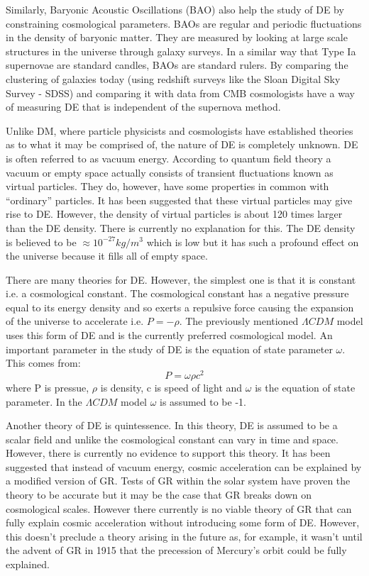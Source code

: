 \documentclass[a4paper,12pt]{article}
\begin{document}
Similarly, Baryonic Acoustic Oscillations (BAO) also
help the study of DE by constraining cosmological parameters. BAOs are regular and periodic fluctuations in the density of baryonic matter. They are measured by looking at large
scale structures in the universe through galaxy surveys. In a similar way that Type Ia supernovae
are standard candles, BAOs are standard rulers. By comparing the clustering of galaxies today (using redshift surveys like the Sloan Digital Sky Survey - SDSS) and comparing it with
data from CMB cosmologists have a way of measuring DE that is independent of the supernova method.

Unlike DM, where particle physicists and cosmologists have established theories as to what it may be comprised of, the nature of DE is completely unknown. DE is often referred to as
vacuum energy. According to quantum field theory a vacuum or empty space actually consists of transient fluctuations known as virtual particles. 
They do, however, have some properties in common with ``ordinary'' particles.
It has been suggested that these virtual particles may give
rise to DE. However, the density of virtual particles is about 120 times larger than the DE density. There is currently no explanation for this. The DE density is believed
to be $\approx10^{-27}kg/m^3$ which is low but it has such a profound effect on the universe because it fills all of empty space.

There are many theories for DE. However, the simplest one is that it is constant i.e. a cosmological constant. The cosmological constant has a negative pressure equal to
its energy density and so exerts a repulsive force causing the expansion of the universe to accelerate i.e. $P=-\rho$. The previously mentioned $\Lambda CDM$ model uses
this form of DE and is the currently preferred cosmological model. An important parameter in the study of DE is the equation of state parameter $\omega$. This comes from: 
\begin{equation}
P=\omega\rho c^2
\end{equation}
where P is pressue, $\rho$ is density, c is speed of light and $\omega$ is the equation of state parameter.
In the $\Lambda CDM$ model $\omega$ is assumed to be -1.

Another theory of DE is quintessence. In this theory, DE is assumed to be a scalar field and unlike the 
cosmological constant can vary in time and space. However, there is currently no evidence to support this theory.
It has been suggested that instead of vacuum energy, cosmic acceleration can be explained by a modified version of GR. Tests of GR within the solar system have proven the theory
to be accurate but it may be the case that GR breaks down on cosmological scales. However there currently is no viable theory of GR that can fully explain cosmic acceleration
without introducing some form of DE. However, this doesn't preclude a theory arising in the future as, for example, it wasn't until the advent of GR in 1915 that the precession
of Mercury's orbit could be fully explained.
\end{document}
